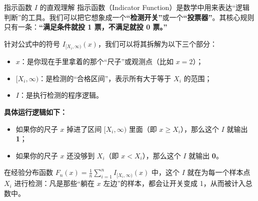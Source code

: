 \begin{note}{指示函数 $I$ 的直观理解}
指示函数（Indicator Function）是数学中用来表达“逻辑判断”的工具。我们可以把它想象成一个\textbf{“检测开关”}或一个\textbf{“投票器”}。其核心规则只有一条：\textbf{“满足条件就投 1 票，不满足就投 0 票。”}

针对公式中的符号 $I_{[X_i, \infty)}(x)$，我们可以将其拆解为以下三个部分：
\begin{itemize}
    \item \textbf{$x$}：是你现在手里拿着的那个“尺子”或观测点（比如 $x=2$）；
    \item \textbf{$[X_i, \infty)$}：是检测的“合格区间”，表示所有大于等于 $X_i$ 的范围；
    \item \textbf{$I$}：是执行检测的程序逻辑。
\end{itemize}

\textbf{具体运行逻辑如下：}
\begin{itemize}
    \item 如果你的尺子 $x$ 掉进了区间 $[X_i, \infty)$ 里面（即 $x \geqslant X_i$），那么这个 $I$ 就输出 \textbf{1}；
    \item 如果你的尺子 $x$ 还没够到 $X_i$（即 $x < X_i$），那么这个 $I$ 就输出 \textbf{0}。
\end{itemize}

在经验分布函数 $F_n(x) = \frac{1}{n} \sum_{i=1}^n I_{[X_i, \infty)}(x)$ 中，这个 $I$ 就在为每一个样本点 $X_i$ 进行检测：凡是那些“躺在 $x$ 左边”的样本，都会让开关变成 1，从而被计入总数中。
\end{note}
